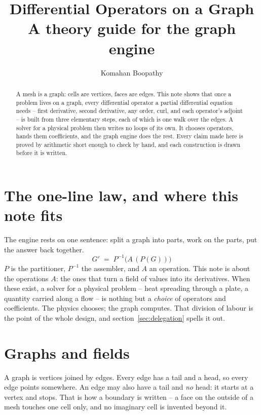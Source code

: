 \documentclass[11pt]{article}
\title{Differential Operators on a Graph\\[4pt]
\large A theory guide for the graph engine}
\author{Komahan Boopathy}
\date{}
\begin{document}
\maketitle

\begin{abstract}
\noindent
A mesh is a graph: cells are vertices, faces are edges. This note
shows that once a problem lives on a graph, every differential
operator a partial differential equation needs -- first derivative,
second derivative, any order, curl, and each operator's adjoint -- is
built from three elementary steps, each of which is one walk over the
edges. A solver for a physical problem then writes no loops of its
own. It chooses operators, hands them coefficients, and the graph
engine does the rest. Every claim made here is proved by arithmetic
short enough to check by hand, and each construction is drawn before
it is written.
\end{abstract}

\section{The one-line law, and where this note fits}

The engine rests on one sentence: split a graph into parts, work on
the parts, put the answer back together.
\[
G' \;=\; P^{-1}\bigl(A\,(P(G))\bigr)
\]
$P$ is the partitioner, $P^{-1}$ the assembler, and $A$ an operation.
This note is about the operations $A$: the ones that turn a field of
values into its derivatives. When these exist, a solver for a
physical problem -- heat spreading through a plate, a quantity
carried along a flow -- is nothing but a \emph{choice} of operators
and coefficients. The physics chooses; the graph computes. That
division of labour is the point of the whole design, and
section~\ref{sec:delegation} spells it out.

\section{Graphs and fields}\label{sec:graphs}

A graph is vertices joined by edges. Every edge has a tail and a
head, so every edge points somewhere. An edge may also have a tail
and \emph{no} head: it starts at a vertex and stops. That is how a
boundary is written -- a face on the outside of a mesh touches one
cell only, and no imaginary cell is invented beyond it.

\begin{center}
\end{center}
\end{document}
